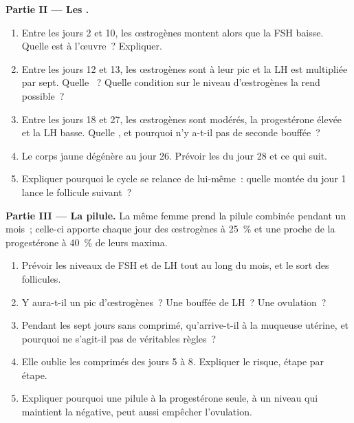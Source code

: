 \begin{problem}
\medskip
\noindent\textbf{Partie II --- Les .}
\begin{enumerate}[resume]
  \item Entre les jours 2 et 10, les œstrogènes montent alors que la
        FSH baisse. Quelle  est à l'œuvre~? Expliquer.
  \item Entre les jours 12 et 13, les œstrogènes sont à leur pic et la
        LH est multipliée par sept. Quelle ~? Quelle
        condition sur le niveau d'œstrogènes la rend possible~?
  \item Entre les jours 18 et 27, les œstrogènes sont modérés, la
        progestérone élevée et la LH basse. Quelle , et
        pourquoi n'y a-t-il pas de seconde bouffée~?
  \item Le corps jaune dégénère au jour 26. Prévoir les  du
        jour 28 et ce qui suit.
  \item Expliquer pourquoi le cycle se relance de lui-même~: quelle
        montée du jour 1 lance le follicule suivant~?
\end{enumerate}

\medskip
\noindent\textbf{Partie III --- La pilule.}
La même femme prend la pilule combinée pendant un mois~; celle-ci
apporte chaque jour des œstrogènes à 25~\% et une  proche de la
progestérone à 40~\% de leurs maxima.
\begin{enumerate}[resume]
  \item Prévoir les niveaux de FSH et de LH tout au long du mois, et le
        sort des follicules.
  \item Y aura-t-il un pic d'œstrogènes~? Une bouffée de LH~? Une
        ovulation~?
  \item Pendant les sept jours sans comprimé, qu'arrive-t-il à la
        muqueuse utérine, et pourquoi ne s'agit-il pas de véritables
        règles~?
  \item Elle oublie les comprimés des jours 5 à 8. Expliquer le risque,
        étape par étape.
  \item Expliquer pourquoi une pilule à la progestérone seule, à un
        niveau qui maintient la  négative, peut aussi
        empêcher l'ovulation.
\end{enumerate}


\end{problem}
